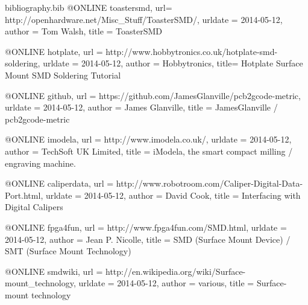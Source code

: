 
\begin{filecontents}{bibliography.bib}
@ONLINE {toastersmd,
    url= {http://openhardware.net/Misc_Stuff/ToasterSMD/},
    urldate = {2014-05-12},
    author = {Tom Walsh},
    title = {ToasterSMD}}
    
@ONLINE {hotplate,
	url = {http://www.hobbytronics.co.uk/hotplate-smd-soldering},
	urldate = {2014-05-12},
	author = {Hobbytronics},
	title= {Hotplate Surface Mount SMD Soldering Tutorial}}
	
@ONLINE {github,
	url = {https://github.com/JamesGlanville/pcb2gcode-metric},
	urldate = {2014-05-12},
	author = {James Glanville},
	title = {JamesGlanville / pcb2gcode-metric}}
	
@ONLINE {imodela,
	url = {http://www.imodela.co.uk/},
	urldate = {2014-05-12},
	author = {TechSoft UK Limited},
	title = {iModela, the smart compact milling / engraving machine.}}
	
@ONLINE {caliperdata,
	url = {http://www.robotroom.com/Caliper-Digital-Data-Port.html},
	urldate = {2014-05-12},
	author = {David Cook},
	title = {Interfacing with Digital Calipers}}
	
@ONLINE {fpga4fun,
	url = {http://www.fpga4fun.com/SMD.html},
	urldate = {2014-05-12},
	author = {Jean P. Nicolle},
	title = {SMD (Surface Mount Device) / SMT (Surface Mount Technology)}}
	
@ONLINE {smdwiki,
	url = {http://en.wikipedia.org/wiki/Surface-mount_technology},
	urldate = {2014-05-12},
	author = {various},
	title = {Surface-mount technology}}
\end{filecontents}

\documentclass[a4paper,11pt]{article}  %
\usepackage[english]{babel}            %
\usepackage{fullpage}                  %
\usepackage{listings}
\usepackage{graphicx}                  %

\usepackage{tikz}
\usetikzlibrary{shapes,arrows}

\usepackage{appendix}
\usepackage{color}
\usepackage{hyperref}

\usepackage{caption}
\usepackage{subcaption}

\usepackage{biblatex}


\usepackage[xindy,toc]{glossaries}
\makeglossaries

{
	name=GCODE,
	description={A human-readable numerical control programming language, commonly used in CNC machines}
}

